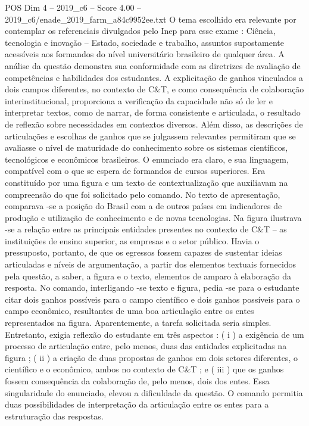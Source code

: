 \begin{textsample}{POS Dim 4 – 2019\_c6 – Score 4.00 – 2019\_c6/enade\_2019\_farm\_a84c9952ee.txt}
O tema escolhido era relevante por contemplar os referenciais divulgados pelo Inep para esse exame : Ciência, tecnologia e inovação – Estado, sociedade e trabalho, assuntos supostamente acessíveis aos formandos do nível universitário brasileiro de qualquer área.
A análise da questão demonstra sua conformidade com as diretrizes de avaliação de competências e habilidades dos estudantes.
A explicitação de ganhos vinculados a dois campos diferentes, no contexto de C\&T, e como consequência de colaboração interinstitucional, proporciona a verificação da capacidade não só de ler e interpretar textos, como de narrar, de forma consistente e articulada, o resultado de reflexão sobre necessidades em contextos diversos.
Além disso, as descrições de articulações e escolhas de ganhos que se julgassem relevantes permitiram que se avaliasse o nível de maturidade do conhecimento sobre os sistemas científicos, tecnológicos e econômicos brasileiros.
O enunciado era claro, e sua linguagem, compatível com o que se espera de formandos de cursos superiores.
Era constituído por uma figura e um texto de contextualização que auxiliavam na compreensão do que foi solicitado pelo comando.
No texto de apresentação, comparava -se a posição do Brasil com a de outros países em indicadores de produção e utilização de conhecimento e de novas tecnologias.
Na figura ilustrava -se a relação entre as principais entidades presentes no contexto de C\&T – as instituições de ensino superior, as empresas e o setor público.
Havia o pressuposto, portanto, de que os egressos fossem capazes de sustentar ideias articuladas e níveis de argumentação, a partir dos elementos textuais fornecidos pela questão, a saber, a figura e o texto, elementos de amparo à elaboração da resposta.
No comando, interligando -se texto e figura, pedia -se para o estudante citar dois ganhos possíveis para o campo científico e dois ganhos possíveis para o campo econômico, resultantes de uma boa articulação entre os entes representados na figura.
Aparentemente, a tarefa solicitada seria simples.
Entretanto, exigia reflexão do estudante em três aspectos : ( i ) a exigência de um processo de articulação entre, pelo menos, duas das entidades explicitadas na figura ; ( ii ) a criação de duas propostas de ganhos em dois setores diferentes, o científico e o econômico, ambos no contexto de C\&T ; e ( iii ) que os ganhos fossem consequência da colaboração de, pelo menos, dois dos entes.
Essa singularidade do enunciado, elevou a dificuldade da questão.
O comando permitia duas possibilidades de interpretação da articulação entre os entes para a estruturação das respostas.

\end{textsample}
